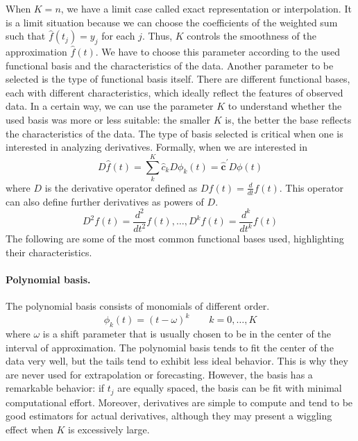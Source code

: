 When $K=n$, we have a limit case called exact representation or interpolation. It is a limit situation because we can choose the coefficients of the weighted sum such that $\hat{f}(t_j)=y_j$ for each $j$. Thus, $K$ controls the smoothness of the approximation $\hat{f}(t)$. We have to choose this parameter according to the used functional basis and the characteristics of the data. Another parameter to be selected is the type of functional basis itself. There are different functional bases, each with different characteristics, which ideally reflect the features of observed data. In a certain way, we can use the parameter $K$ to understand whether the used basis was more or less suitable: the smaller $K$ is, the better the base reflects the characteristics of the data. The type of basis selected is critical when one is interested in analyzing derivatives. Formally, when we are interested in
\begin{equation}
    \label{eq:derivative}
    D \hat{f}(t)=\sum_k^K \hat{c}_k D \phi_k(t)=\hat{\mathbf{c}}^{\prime} D \phi(t)
\end{equation}
where $D$ is the derivative operator defined as $Df(t)=\frac{d}{dt}f(t)$. This operator can also define further derivatives as powers of $D$.
\begin{equation}
    \label{eq:deroperator}
    D^2f(t)=\frac{d^2}{dt^2}f(t), \dots, D^kf(t)=\frac{d^k}{dt^k}f(t)
\end{equation}
The following are some of the most common functional bases used, highlighting their characteristics.
\paragraph{Polynomial basis.} The polynomial basis consists of monomials of different order.
\begin{equation}
    \label{eq:polinomial}
    \phi_k(t)=(t-\omega)^k \qquad k=0,\dots, K
\end{equation}
where $\omega$ is a shift parameter that is usually chosen to be in the center of the interval of approximation. The polynomial basis tends to fit the center of the data very well, but the tails tend to exhibit less ideal behavior. This is why they are never used for extrapolation or forecasting. However, the basis has a remarkable behavior: if $t_j$ are equally spaced, the basis can be fit with minimal computational effort. Moreover, derivatives are simple to compute and tend to be good estimators for actual derivatives, although they may present a wiggling effect when $K$ is excessively large. 
